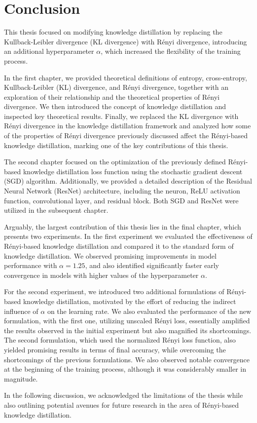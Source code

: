 \chapter*{Conclusion}

This thesis focused on modifying knowledge distillation by replacing the Kullback-Leibler divergence (KL divergence) with Rényi divergence, introducing an additional hyperparameter $\alpha$, which increased the flexibility of the training process.

In the first chapter, we provided theoretical definitions of entropy, cross-entropy, Kullback-Leibler (KL) divergence, and Rényi divergence, together with an exploration of their relationship and the theoretical properties of Rényi divergence. We then introduced the concept of knowledge distillation and inspected key theoretical results. Finally, we replaced the KL divergence with Rényi divergence in the knowledge distillation framework and analyzed how some of the properties of Rényi divergence previously discussed affect the Rényi-based knowledge distillation, marking one of the key contributions of this thesis. 

The second chapter focused on the optimization of the previously defined Rényi-based knowledge distillation loss function using the stochastic gradient descent (SGD) algorithm. Additionally, we provided a detailed description of the Residual Neural Network (ResNet) architecture, including the neuron, ReLU activation function, convolutional layer, and residual block. Both SGD and ResNet were utilized in the subsequent chapter.

Arguably, the largest contribution of this thesis lies in the final chapter, which presents two experiments. In the first experiment we evaluated the effectiveness of Rényi-based knowledge distillation and compared it to the standard form of knowledge distillation. We observed promising improvements in model performance with $\alpha = 1.25$, and also identified significantly faster early convergence in models with higher values of the hyperparameter $\alpha$.

For the second experiment, we introduced two additional formulations of Rényi-based knowledge distillation, motivated by the effort of reducing the indirect influence of $\alpha$ on the learning rate. We also evaluated the performance of the new formulation, with the first one, utilizing unscaled Rényi loss, essentially amplified the results observed in the initial experiment but also magnified its shortcomings. The second formulation, which used the normalized Rényi loss function, also yielded promising results in terms of final accuracy, while overcoming the shortcomings of the previous formulations. We also observed notable convergence at the beginning of the training process, although it was considerably smaller in magnitude.

In the following discussion, we acknowledged the limitations of the thesis while also outlining potential avenues for future research in the area of Rényi-based knowledge distillation.

